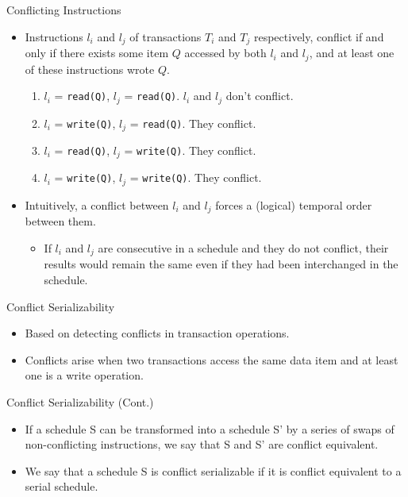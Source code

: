 \documentclass{beamer}
\begin{document}
\begin{frame}{Conflicting Instructions}
    \begin{itemize}
        \item Instructions $l_i$ and $l_j$ of transactions $T_i$ and $T_j$ respectively, conflict if and only if there exists some item $Q$ accessed by both $l_i$ and $l_j$, and at least one of these instructions wrote $Q$.
            \begin{enumerate}
                \item $l_i$ = \texttt{read(Q)}, $l_j$ = \texttt{read(Q)}. $l_i$ and $l_j$ don't conflict.
                \item $l_i$ = \texttt{write(Q)}, $l_j$ = \texttt{read(Q)}. They conflict.
                \item $l_i$ = \texttt{read(Q)}, $l_j$ = \texttt{write(Q)}. They conflict.
                \item $l_i$ = \texttt{write(Q)}, $l_j$ = \texttt{write(Q)}. They conflict.
            \end{enumerate}

        \item Intuitively, a conflict between $l_i$ and $l_j$ forces a (logical) temporal order between them.
            \begin{itemize}
                \item If $l_i$ and $l_j$ are consecutive in a schedule and they do not conflict, their results would remain the same even if they had been interchanged in the schedule.
            \end{itemize}

    \end{itemize}
\end{frame}

\begin{frame}{Conflict Serializability}
    \begin{itemize}
        \item Based on detecting conflicts in transaction operations.
        \item Conflicts arise when two transactions access the same data item and at least one is a write operation.
    \end{itemize}
\end{frame}

\begin{frame}{Conflict Serializability (Cont.)}
    \begin{itemize}
        \item If a schedule S can be transformed into a schedule S' by a series of swaps of non-conflicting instructions, we say that S and S' are conflict equivalent.
        \item We say that a schedule S is conflict serializable if it is conflict equivalent to a serial schedule.
    \end{itemize}
\end{frame}
\end{document}

